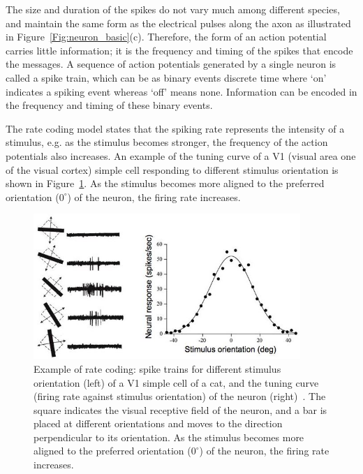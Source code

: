 The size and duration of the spikes do not vary much among different species, and maintain the same form as the electrical pulses \DIFdelbegin {}\DIFdelend \DIFaddbegin {}\DIFaddend along the axon as illustrated in Figure~\ref{Fig:neuron_basic}(c).
Therefore, the form of an action potential carries little information;
it is the frequency and timing of the spikes that encode the messages.
A sequence of action potentials generated by a single neuron is called a spike train, which can be \DIFdelbegin {}\DIFdelend \DIFaddbegin {}\DIFaddend as binary events \DIFdelbegin {}\DIFdelend \DIFaddbegin {}\DIFaddend discrete time where `on' indicates a spiking event \DIFaddbegin {}\DIFaddend whereas `off' means none.
Information can be encoded in the frequency and timing of these binary events.


The rate coding model states that the spiking rate represents the intensity of a stimulus, e.g. as the stimulus becomes stronger, the frequency of the action potentials also increases.
An example of the tuning curve of a V1 (visual area one of the visual cortex) simple cell responding to different stimulus orientation is shown in Figure~\ref{Fig:v1}.
As the stimulus becomes more aligned to the preferred orientation ($0^\circ$) of the neuron, the firing rate increases.

\begin{figure}[bt]
	\centering
	\includegraphics[width=0.9\textwidth]{pics_snn/v1.jpg}
	\caption{Example of rate coding: spike trains for different stimulus orientation (left) of a V1 simple cell of a cat, and the tuning curve (firing rate against stimulus orientation) of the neuron (right)~\DIFdelbeginFL {}\DIFdelendFL \DIFaddbeginFL {}\DIFaddendFL .
	The square indicates the visual receptive field of the neuron, and a bar is placed at different orientations and moves to the direction perpendicular to its orientation.
    As the stimulus becomes more aligned to the preferred orientation ($0^\circ$) of the neuron, the firing rate increases.}
	\label{Fig:v1}
\end{figure}

